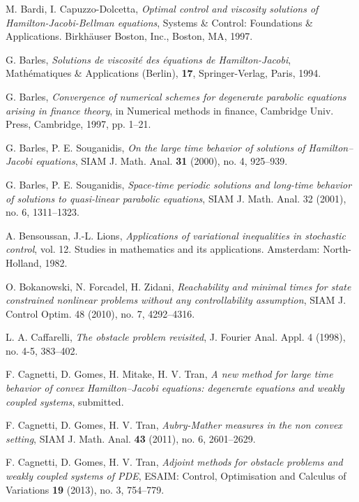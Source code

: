 \documentclass[12pt,reqno]{amsart}
\theoremstyle{plain}
\theoremstyle{remark}
\numberwithin{equation}{section}
\begin{document}
\begin{thebibliography}{30} 

M. Bardi, I. Capuzzo-Dolcetta, 
\emph{Optimal control and viscosity solutions of Hamilton-Jacobi-Bellman equations}, 
Systems \& Control: Foundations \& Applications. Birkh\"auser Boston, Inc., Boston, MA, 1997. 

G. Barles, 
\emph{Solutions de viscosit\'e des \'equations de Hamilton-Jacobi}, 
Math\'ematiques \& Applications (Berlin), {\bf 17}, Springer-Verlag, Paris, 1994. 

G. Barles, 
\emph{Convergence of numerical schemes for degenerate parabolic equations arising in finance theory}, 
in Numerical methods in finance, Cambridge Univ. Press, Cambridge, 1997, pp. 1--21.

G. Barles, P. E. Souganidis, \emph{On the large time behavior of solutions of Hamilton--Jacobi equations}, 
SIAM J. Math. Anal. {\bf 31} (2000), no. 4, 925--939. 

G. Barles, P. E. Souganidis, 
\emph{Space-time periodic solutions and long-time behavior of solutions to quasi-linear parabolic equations}, 
SIAM J. Math. Anal. 32 (2001), no. 6, 1311--1323. 

A. Bensoussan,  J.-L. Lions, 
\emph{Applications of variational inequalities in stochastic control},
vol. 12. Studies in mathematics and its applications. Amsterdam: North-Holland, 
1982.

O. Bokanowski, N. Forcadel, H. Zidani, 
\emph{Reachability and minimal times for state constrained nonlinear problems without any controllability assumption}, 
SIAM J. Control Optim. 48 (2010), no. 7, 4292--4316. 

L. A. Caffarelli, 
\emph{The obstacle problem revisited}, 
J. Fourier Anal. Appl. 4 (1998), no. 4-5, 383--402. 

F. Cagnetti, D. Gomes, H. Mitake, H. V. Tran, 
\emph{A new method for large time behavior of convex Hamilton--Jacobi equations: degenerate equations and weakly coupled systems}, 
submitted. 

F. Cagnetti, D. Gomes, H. V. Tran, 
\emph{Aubry-Mather measures in the non convex setting},
{SIAM J. Math. Anal. {\bf 43} (2011), no. 6, 2601--2629}. 

F. Cagnetti, D. Gomes, H. V. Tran, 
\emph{Adjoint methods for obstacle problems and weakly coupled systems of {P}{D}{E}}, 
ESAIM: Control, Optimisation and Calculus of Variations {\bf 19} (2013), no. 3, 754--779. 


\end{thebibliography}
\end{document}
